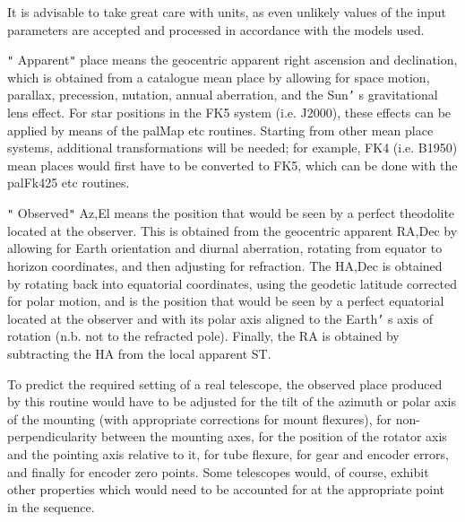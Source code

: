 \documentclass[twoside,11pt,nolof]{starlink}
\begin{document}
{{{         \sstitem
          It is advisable to take great care with units, as even
           unlikely values of the input parameters are accepted and
           processed in accordance with the models used.

         \sstitem
          \texttt{"} Apparent\texttt{"}  place means the geocentric apparent right ascension
           and declination, which is obtained from a catalogue mean place
           by allowing for space motion, parallax, precession, nutation,
           annual aberration, and the Sun\texttt{'} s gravitational lens effect.  For
           star positions in the FK5 system (i.e. J2000), these effects can
           be applied by means of the palMap etc routines.  Starting from
           other mean place systems, additional transformations will be
           needed;  for example, FK4 (i.e. B1950) mean places would first
           have to be converted to FK5, which can be done with the
           palFk425 etc routines.

         \sstitem
          \texttt{"} Observed\texttt{"}  Az,El means the position that would be seen by a
           perfect theodolite located at the observer.  This is obtained
           from the geocentric apparent RA,Dec by allowing for Earth
           orientation and diurnal aberration, rotating from equator
           to horizon coordinates, and then adjusting for refraction.
           The HA,Dec is obtained by rotating back into equatorial
           coordinates, using the geodetic latitude corrected for polar
           motion, and is the position that would be seen by a perfect
           equatorial located at the observer and with its polar axis
           aligned to the Earth\texttt{'} s axis of rotation (n.b. not to the
           refracted pole).  Finally, the RA is obtained by subtracting
           the HA from the local apparent ST.

         \sstitem
          To predict the required setting of a real telescope, the
           observed place produced by this routine would have to be
           adjusted for the tilt of the azimuth or polar axis of the
           mounting (with appropriate corrections for mount flexures),
           for non-perpendicularity between the mounting axes, for the
           position of the rotator axis and the pointing axis relative
           to it, for tube flexure, for gear and encoder errors, and
           finally for encoder zero points.  Some telescopes would, of
           course, exhibit other properties which would need to be
           accounted for at the appropriate point in the sequence.

}}}
\end{document}
